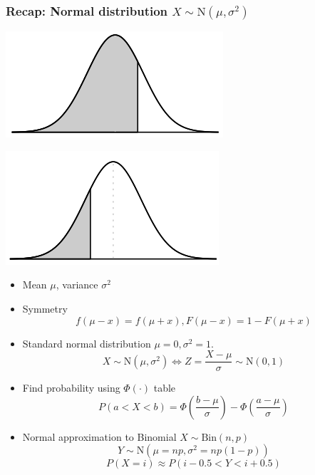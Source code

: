 \documentclass[slidestop,compress,mathserif]{beamer}
\begin{document}
\begin{frame}\frametitle{Recap: Normal distribution $X \sim \text{N}(\mu, \sigma^2)$}

{
\begin{center}
\includegraphics[scale = 0.3]{figures/cdf_pos}
\end{center}
\begin{center}
\includegraphics[scale = 0.3]{figures/cdf_neg}
\end{center}
}
{
\begin{itemize}
\item Mean $\mu$, variance $\sigma^2$
\item Symmetry \vspace{-0.2cm}
\[ f(\mu-x) = f(\mu+x), F(\mu-x) = 1 - F(\mu+x) \]
\item \vspace{-0.2cm}
Standard normal distribution $\mu = 0, \sigma^2 = 1$. \vspace{-0.2cm}
\[ X \sim \text{N}(\mu, \sigma^2) \Longleftrightarrow Z = \frac{X - \mu}{\sigma} \sim \text{N}(0, 1)\]
\item \vspace{-0.2cm}
Find probability using $\Phi(\cdot)$ table \vspace{-0.2cm}
\[ P(a< X < b) = \Phi\left( \frac{b - \mu}{\sigma}\right) - \Phi\left( \frac{a - \mu}{\sigma}\right) \]
\item \vspace{-0.2cm}
Normal approximation to Binomial $X \sim \text{Bin}(n, p)$ \vspace{-0.2cm}
\[ Y \sim \text{N}(\mu = np, \sigma^2 = np(1-p))\] \[P(X = i) \approx P(i - 0.5 < Y < i + 0.5) \]
\end{itemize}
}


\end{frame}
\end{document}
